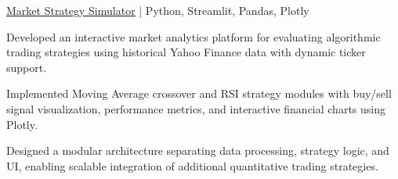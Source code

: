 \begin{cvproject}{\href{https://github.com/grvsnh/market-strategy-simulator}{\uline{Market Strategy Simulator}} | Python, Streamlit, Pandas, Plotly}{}
    \item Developed an interactive market analytics platform for evaluating algorithmic trading strategies using historical Yahoo Finance data with dynamic ticker support.
    \item Implemented Moving Average crossover and RSI strategy modules with buy/sell signal visualization, performance metrics, and interactive financial charts using Plotly.
    \item Designed a modular architecture separating data processing, strategy logic, and UI, enabling scalable integration of additional quantitative trading strategies.
\end{cvproject}